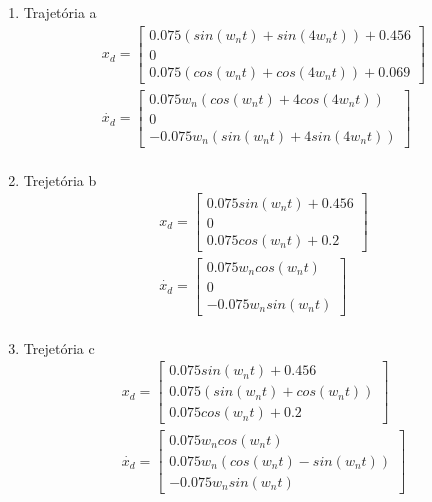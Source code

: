 \documentclass[a4paper,11pt]{article}
\theoremstyle{mytheor}
\begin{document}
\renewcommand{\labelenumi}{\alph{enumi}}
 \begin{enumerate}
   \item Trajetória a
   	\begin{gather*}
	x_{d} = 
	\begin{bmatrix} 
	0.075 (sin(w_n t) + sin( 4 w_n t)) + 0.456 \\ 
	0 \\ 
	0.075 (cos(w_n t) + cos( 4 w_n t)) + 0.069 
	\end{bmatrix} \\
	\dot{x_{d}} = 
	\begin{bmatrix}
	0.075 w_n (cos(w_n t) + 4 cos( 4 w_n t)) \\ 
	0 \\ 
	-0.075 w_n (sin(w_n t) + 4 sin( 4 w_n t)) 
	\end{bmatrix} \\
	\end{gather*}
   \item Trejetória b
   	\begin{gather*}
	x_{d} = 
	\begin{bmatrix} 
	0.075 sin(w_n t) + 0.456 \\ 
	0 \\ 
	0.075 cos(w_n t) + 0.2 
	\end{bmatrix} \\
	\dot{x_{d}} = 
	\begin{bmatrix} 
	0.075 w_n cos(w_n t) \\ 
	0 \\ 
	- 0.075 w_n sin(w_n t) 
	\end{bmatrix} \\
	\end{gather*}
   \item Trejetória c
   	\begin{gather*}
	x_{d} = 
	\begin{bmatrix} 
	0.075 sin(w_n t) + 0.456 \\ 
	0.075 (sin(w_n t) + cos(w_n t)) \\ 
	0.075 cos(w_n t) + 0.2 
	\end{bmatrix} \\
	\dot{x_{d}} = 
	\begin{bmatrix} 
	0.075 w_n cos(w_n t) \\ 
	0.075 w_n (cos(w_n t) - sin(w_n t)) \\ 
	- 0.075 w_n sin(w_n t) 
	\end{bmatrix} \\
	\end{gather*}
 \end{enumerate}
\end{document}
